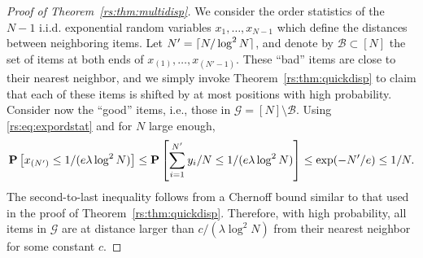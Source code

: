 \begin{proof}[Proof of Theorem~\ref{rs:thm:multidisp}]
We consider the order statistics of the $N - 1$ i.i.d. exponential random variables $x_1, \ldots, x_{N-1}$ which define the distances between neighboring items.
Let $N' = \lceil N / \log^2 N\rceil$, and denote by $\mathcal{B} \subset [N]$ the set of items at both ends of $x_{(1)}, \ldots, x_{(N' - 1)}$.
These ``bad'' items are close to their nearest neighbor, and we simply invoke Theorem~\ref{rs:thm:quickdisp} to claim that each of these items is shifted by at most  positions with high probability.
Consider now the ``good'' items, i.e., those in $\mathcal{G} = [N] \setminus \mathcal{B}$.
Using \eqref{rs:eq:expordstat} and for $N$ large enough,
\begin{align*}
\mathbf{P}\left[ x_{(N')} \le 1/(e \lambda \log^2 N) \right]
    \le \mathbf{P}\left[ \sum_{i=1}^{N'} y_i / N \le 1/(e \lambda \log^2 N) \right]
    \le \exp(-N' / e) \le 1 / N.
\end{align*}
The second-to-last inequality follows from a Chernoff bound similar to that used in the proof of Theorem~\ref{rs:thm:quickdisp}.
Therefore, with high probability, all items in $\mathcal{G}$ are at distance larger than $c / (\lambda \log^2 N)$ from their nearest neighbor for some constant $c$.


\end{proof}

